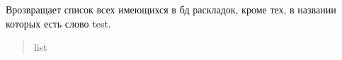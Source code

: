 \documentclass[a4paper,11pt,russian,openany,oneside]{sphinxmanual}
\begin{document}
\begin{savenotes}\begin{fulllineitems}
\label{\detokenize{_autosummary/database_module.database:database_module.database.take_lk_names_from_lk}}
\pysigstartsignatures
\pysiglinewithargsret
{}
{}
{}
\pysigstopsignatures
\sphinxAtStartPar
Врозвращает список всех имеющихся в бд раскладок,
кроме тех, в названии которых есть слово test.
\begin{quote}\begin{description}
\sphinxAtStartPar
list

\end{description}\end{quote}

\end{fulllineitems}\end{savenotes}

\end{document}
